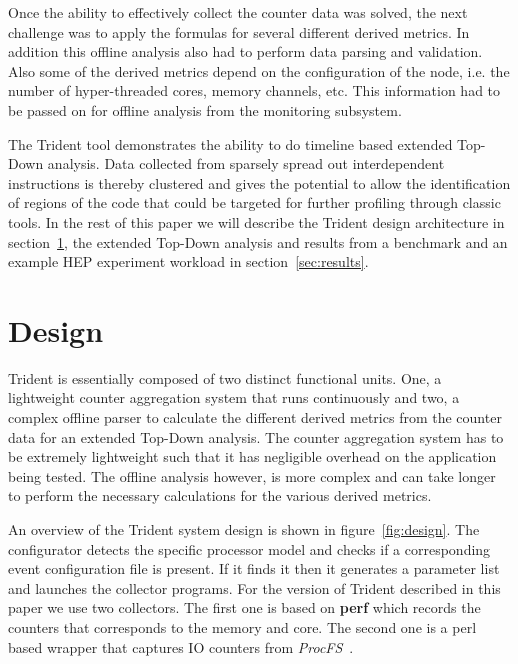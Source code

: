 \documentclass{webofc}
\begin{document}
Once the ability to effectively collect the counter data was solved, the next challenge was to apply the formulas for several different derived metrics. In addition this offline analysis also had to perform data parsing and validation. Also some of the derived metrics depend on the configuration of the node, i.e. the number of hyper-threaded cores, memory channels, etc. This information had to be passed on for offline analysis from the monitoring subsystem. 

The Trident tool demonstrates the ability to do timeline based extended Top-Down analysis. Data collected from sparsely spread out interdependent instructions is thereby clustered and gives the potential to allow the identification of regions of the code that could be targeted for further profiling through classic tools. In the rest of this paper we will describe the Trident design architecture in section~\ref{sec:design}, the extended Top-Down analysis and results from a benchmark and an example HEP experiment workload in section~\ref{sec:results}.


\section{Design}
\label{sec:design}

Trident is essentially composed of two distinct functional units. One, a lightweight counter aggregation system that runs continuously and two, a complex offline parser to calculate the different derived metrics from the counter data for an extended Top-Down analysis. The counter aggregation system has to be extremely lightweight such that it has negligible overhead on the application being tested. The offline analysis however, is more complex and can take longer to perform the necessary calculations for the various derived metrics. 

An overview of the Trident system design is shown in figure~\ref{fig:design}. The configurator detects the specific processor model and checks if a corresponding event configuration file is present. If it finds it then it generates a parameter list and launches the collector programs. For the version of Trident described in this paper we use two collectors. The first one is based on \textbf{perf} which records the counters that corresponds to the memory and core. The second one is a perl based wrapper that captures IO counters from \textit{ProcFS}~\cite{}. 
\end{document}
